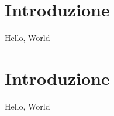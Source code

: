 \documentclass{article}
\begin{document}
\section{Introduzione}
Hello, World
\section{Introduzione}
Hello, World
\end{document}
